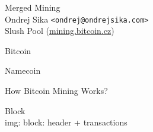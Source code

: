 \documentclass{beamer}
\begin{document}
\Large
\begin{frame}

    {\Huge Merged Mining}\\
    \vspace{7mm}
    {\LARGE Ondrej Sika \lstinline|<ondrej@ondrejsika.com>|}\\
    \vspace{7mm}
    {\Large Slush Pool (\url{mining.bitcoin.cz})}\\

\end{frame}

\begin{frame}

    {\Huge Bitcoin}\\

\end{frame}

\begin{frame}

    {\Huge Namecoin}\\

\end{frame}

\begin{frame}

    {\Huge How Bitcoin Mining Works?}\\

\end{frame}

\begin{frame}

    {\Huge Block}\\

    img: block: header + transactions



\end{frame}
\end{document}
